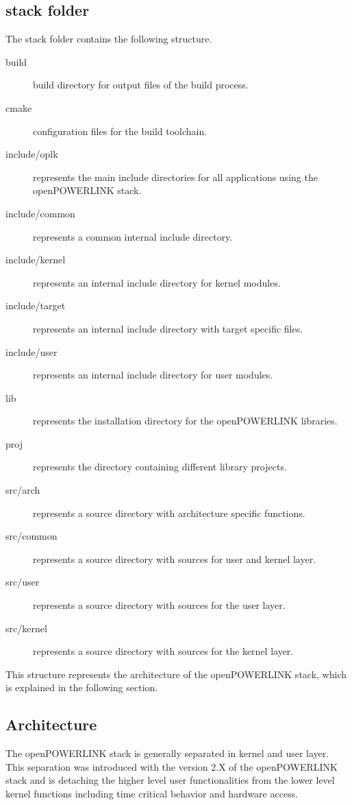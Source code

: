 \subsection{stack folder}
\label{sec:oplk_structure_stack}
The stack folder contains the following structure. \cite{openpowerlink_doc} %
\begin{description}
    \item[build] build directory for output files of the build process.
    \item[cmake] configuration files for the build toolchain.
    \item[include/oplk] represents the main include directories for all applications using the openPOWERLINK stack.
    \item[include/common] represents a common internal include directory.
    \item[include/kernel] represents an internal include directory for kernel modules.
    \item[include/target] represents an internal include directory with target specific files.
    \item[include/user] represents an internal include directory for user modules.
    \item[lib] represents the installation directory for the openPOWERLINK libraries.
    \item[proj] represents the directory containing different library projects.
    \item[src/arch] represents a source directory with architecture specific functions.
    \item[src/common] represents a source directory with sources for user and kernel layer.
    \item[src/user] represents a source directory with sources for the user layer.
    \item[src/kernel] represents a source directory with sources for the kernel layer.
\end{description}

This structure represents the architecture of the openPOWERLINK stack, which is explained in the following section.

\subsection{Architecture}
\label{sec:oplk_structure_architecture}

The openPOWERLINK stack is generally separated in kernel and user layer.
This separation was introduced with the version 2.X of the openPOWERLINK stack and is detaching the higher level user functionalities from the lower level kernel functions including time critical behavior and hardware access.

